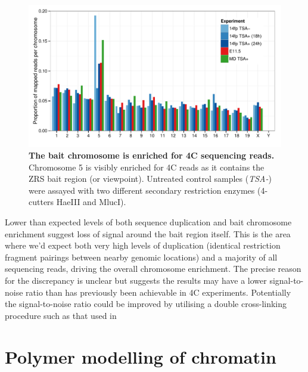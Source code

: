 \documentclass[a4paper,11pt,oneside]{book}
\begin{document}
\begin{figure}
\begin{center} 
\includegraphics[width=5.4in]{figs/4c_chromosomes_v2.pdf}
\captionsetup{width=\textwidth} 
\caption[ The bait chromosome is enriched for 4C sequencing reads. ]{ {\bf The bait chromosome is enriched for 4C sequencing reads. }
Chromosome 5 is visibly enriched for 4C reads as it  contains the ZRS bait region (or viewpoint). Untreated control samples (\emph{TSA-}) were assayed with two different secondary restriction enzymes (4-cutters HaeIII and MlucI).
}\label{fig:4cchromosomes}
\end{center} 
\end{figure} 

Lower than expected levels of both sequence duplication and bait chromosome enrichment suggest loss of signal around the bait region itself. This is the area where we'd expect both very high levels of duplication (identical restriction fragment pairings between nearby genomic locations) and a majority of all sequencing reads, driving the overall chromosome enrichment. The precise reason for the discrepancy is unclear but suggests the results may have a lower signal-to-noise ratio than has previously been achievable in 4C experiments.\cite{Stadhouders2013} Potentially the signal-to-noise ratio could be improved by utilising a double cross-linking procedure such as that used in \citet{Lin2012}

\section{Polymer modelling of chromatin}
\end{document}
